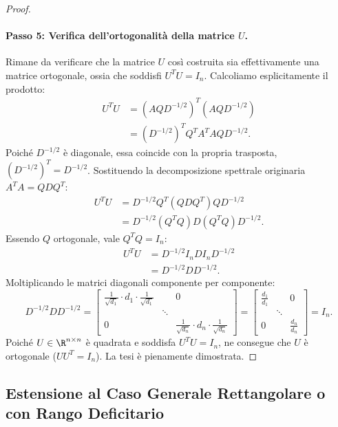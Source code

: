 \begin{proof}
\paragraph{Passo 5: Verifica dell'ortogonalit\`a della matrice $U$.}
Rimane da verificare che la matrice $U$ cos\`i costruita sia effettivamente una matrice ortogonale, ossia che soddisfi $U^T U = I_n$.
Calcoliamo esplicitamente il prodotto:
\begin{align}
    U^T U &= \left( A Q D^{-1/2} \right)^T \left( A Q D^{-1/2} \right) \nonumber \\
          &= \left( D^{-1/2} \right)^T Q^T A^T A Q D^{-1/2}.
\end{align}
Poich\'e $D^{-1/2}$ \`e diagonale, essa coincide con la propria trasposta, $(D^{-1/2})^T = D^{-1/2}$. Sostituendo la decomposizione spettrale originaria $A^T A = Q D Q^T$:
\begin{align}
    U^T U &= D^{-1/2} Q^T (Q D Q^T) Q D^{-1/2} \nonumber \\
          &= D^{-1/2} (Q^T Q) D (Q^T Q) D^{-1/2}.
\end{align}
Essendo $Q$ ortogonale, vale $Q^T Q = I_n$:
\begin{align}
    U^T U &= D^{-1/2} I_n D I_n D^{-1/2} \nonumber \\
          &= D^{-1/2} D D^{-1/2}.
\end{align}
Moltiplicando le matrici diagonali componente per componente:
\begin{equation}
    D^{-1/2} D D^{-1/2} = \begin{bmatrix}
        \frac{1}{\sqrt{d_1}} \cdot d_1 \cdot \frac{1}{\sqrt{d_1}} & & 0 \\
        & \ddots & \\
        0 & & \frac{1}{\sqrt{d_n}} \cdot d_n \cdot \frac{1}{\sqrt{d_n}}
    \end{bmatrix} = \begin{bmatrix}
        \frac{d_1}{d_1} & & 0 \\
        & \ddots & \\
        0 & & \frac{d_n}{d_n}
    \end{bmatrix} = I_n.
\end{equation}
Poich\'e $U \in \R^{n \times n}$ \`e quadrata e soddisfa $U^T U = I_n$, ne consegue che $U$ \`e ortogonale ($U U^T = I_n$). La tesi \`e pienamente dimostrata.
\end{proof}

\subsection{Estensione al Caso Generale Rettangolare o con Rango Deficitario}

